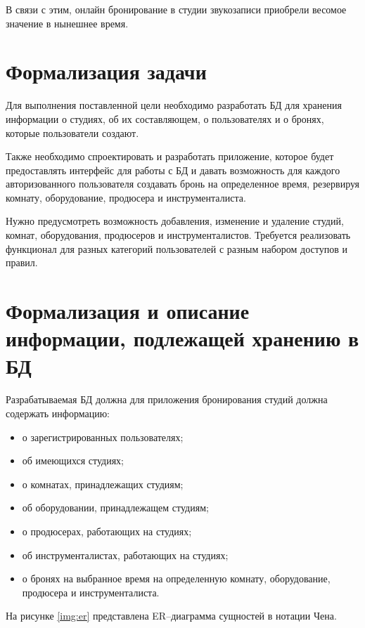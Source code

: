 В связи с этим, онлайн бронирование в студии звукозаписи приобрели весомое значение в нынешнее время.

\section{Формализация задачи}
Для выполнения поставленной цели необходимо разработать БД для хранения информации о студиях, об их составляющем, о пользователях и о бронях, которые пользователи создают.

Также необходимо спроектировать и разработать приложение, которое будет предоставлять интерфейс для работы с БД и давать возможность для каждого авторизованного пользователя создавать бронь на определенное время, резервируя комнату, оборудование, продюсера и инструменталиста.

Нужно предусмотреть возможность добавления, изменение и удаление студий, комнат, оборудования, продюсеров и инструменталистов.
Требуется реализовать функционал для разных категорий пользователей с разным набором доступов и правил.

\section{Формализация и описание информации, подлежащей хранению в БД}
Разрабатываемая БД должна для приложения бронирования студий должна содержать информацию:
\begin{itemize}
	\item о зарегистрированных пользователях;
	\item об имеющихся студиях;
	\item о комнатах, принадлежащих студиям;
	\item об оборудовании, принадлежащем студиям;
	\item о продюсерах, работающих на студиях;
	\item об инструменталистах, работающих на студиях;
	\item о бронях на выбранное время на определенную комнату, оборудование, продюсера и инструменталиста.
\end{itemize}

На рисунке \ref{img:er} представлена ER--диаграмма сущностей в нотации Чена.


